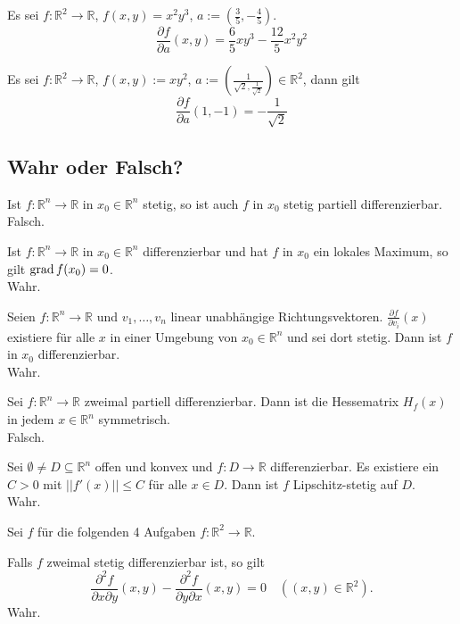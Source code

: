 Es sei $f : \mathbb{R}^2 \to \mathbb{R}$, $f(x,y) = x^2y^3$, $a := \left(\frac{3}{5}, -\frac{4}{5}\right)$.
\begin{displaymath}
  \frac{\partial f}{\partial a}(x,y) = \frac{6}{5}xy^3 - \frac{12}{5}x^2y^2
\end{displaymath}

Es sei $f : \mathbb{R}^2 \to \mathbb{R}$, $f(x,y) := xy^2$, $a := \left(\frac{1}{\sqrt{2}, \frac{1}{\sqrt{2}}}\right) \in \mathbb{R}^2$, dann gilt
\begin{displaymath}
  \frac{\partial f}{\partial a}(1, -1) = -\frac{1}{\sqrt{2}}
\end{displaymath}

\subsection{Wahr oder Falsch?}
Ist $f : \mathbb{R}^n \to \mathbb{R}$ in $x_0 \in \mathbb{R}^n$ stetig, so ist auch $f$ in $x_0$ stetig partiell differenzierbar.\\
Falsch.

Ist $f : \mathbb{R}^n \to \mathbb{R}$ in $x_0 \in \mathbb{R}^n$ differenzierbar und hat $f$ in $x_0$ ein lokales Maximum, so gilt $\operatorname{grad} f(x_0) = 0$.\\
Wahr.

Seien $f : \mathbb{R}^n \to \mathbb{R}$ und $v_1, \dots, v_n$ linear unabhängige Richtungsvektoren.
$\frac{\partial f}{\partial v_i}(x)$ existiere für  alle $x$ in einer Umgebung von $x_0 \in \mathbb{R}^n$ und sei dort stetig.
Dann ist $f$ in $x_0$ differenzierbar.\\
Wahr.

Sei $f : \mathbb{R}^n \to \mathbb{R}$ zweimal partiell differenzierbar.
Dann ist die Hessematrix $H_f(x)$ in jedem $x \in \mathbb{R}^n$ symmetrisch.\\
Falsch.

Sei $\emptyset \neq D \subseteq \mathbb{R}^n$ offen und konvex und $f : D \to \mathbb{R}$ differenzierbar.
Es existiere ein $C > 0$ mit $|| f'(x) || \leq C$ für alle $x \in D$.
Dann ist $f$ Lipschitz-stetig auf $D$.\\
Wahr.

Sei $f$ für die folgenden 4 Aufgaben $f : \mathbb{R}^2 \to \mathbb{R}$.

Falls $f$ zweimal stetig differenzierbar ist, so gilt
\begin{displaymath}
  \frac{\partial^2 f}{\partial x \partial y}(x,y) - \frac{\partial^2 f}{\partial y \partial x}(x,y) = 0 \quad ((x,y) \in \mathbb{R}^2).
\end{displaymath}
Wahr.


